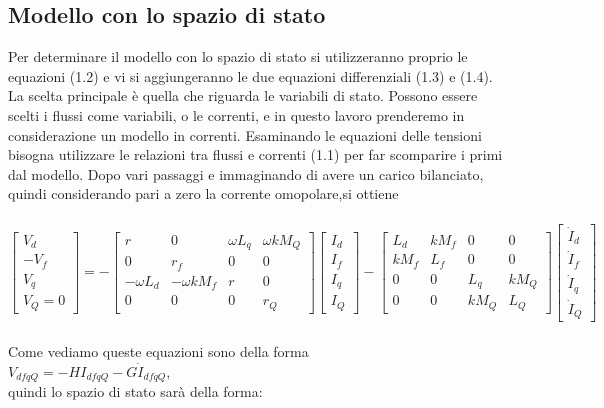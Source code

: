 \documentclass[Lau,noexaminfo]{sapthesis}
\begin{document}
	\subsection{Modello con lo spazio di stato}Per determinare il modello con lo spazio di stato si utilizzeranno proprio le equazioni (1.2) e vi si aggiungeranno le due equazioni differenziali (1.3) e (1.4). La scelta principale è quella che riguarda le variabili di stato. Possono essere scelti i flussi come variabili, o le correnti, e in questo lavoro prenderemo in considerazione un modello in correnti. Esaminando le equazioni delle tensioni bisogna utilizzare le relazioni tra flussi e correnti (1.1) per far scomparire i primi dal modello. Dopo vari passaggi e immaginando di avere un carico bilanciato, quindi considerando pari a zero la corrente omopolare,si ottiene\\\\
	$\begin{bmatrix}
	V_d \\
	-V_f \\
	V_q \\
	V_Q=0
	\end{bmatrix}=
	-\begin{bmatrix}
	r & 0 & \omega L_q & \omega kM_Q \\
	0 & r_f & 0 & 0\\
	-\omega L_d & -\omega kM_f & r & 0\\
	0 & 0 & 0 & r_Q
	\end{bmatrix}
	\begin{bmatrix}
	I_d\\
	I_f\\
	I_q\\
	I_Q
	\end{bmatrix}
	-\begin{bmatrix}
	L_d & kM_f & 0 & 0\\
	kM_f & L_f & 0 & 0\\
	0 & 0 & L_q &  kM_Q\\
	0 & 0 & kM_Q & L_Q
	\end{bmatrix} \begin{bmatrix}
	\dot{I}_d\\
	\dot{I}_f\\
	\dot{I}_q\\
	\dot{I}_Q
	\end{bmatrix} $\\
	\\
	Come vediamo queste equazioni sono della forma\\
	$V_{dfqQ}=-H I_{dfqQ} - G \dot{I}_{dfqQ}$, \\quindi lo spazio di stato sarà della forma:\\
\end{document}
